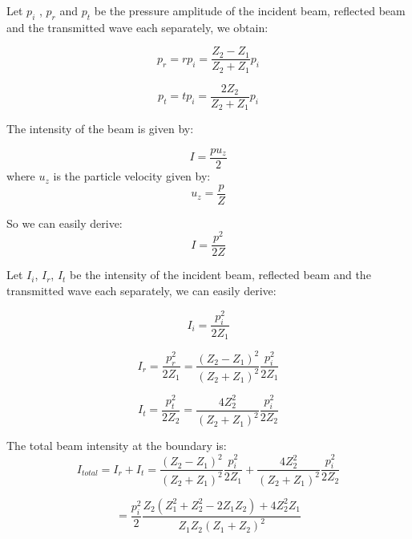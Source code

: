 \documentclass[11pt,a4paper,BCOR12mm, headexclude, footexclude, twoside, openright]{scrartcl}
\numberwithin{equation}{section} %
\numberwithin{figure}{section} %
\numberwithin{table}{section} %
\begin{document}
Let $p_i$ , $p_r$ and $p_t$ be the pressure amplitude of the incident beam, reflected beam and the transmitted wave each separately, we obtain:

\begin{equation}
     p_r = rp_i=\frac{Z_2 - Z_1}{Z_2 + Z_1}p_i
\end{equation}

\begin{equation}
     p_t = tp_i=\frac{2Z_2}{Z_2 + Z_1}p_i
\end{equation}

The intensity of the beam is given by:

\begin{equation}
     I =\frac{pu_z}{2}
\end{equation}
where $u_z$ is the particle velocity given by:
\begin{equation}
     u_z =\frac{p}{Z}
\end{equation}

So we can easily derive:
\begin{equation}
     I =\frac{p^2}{2Z}
\end{equation}

Let $I_i$, $I_r$, $I_t$ be the intensity of the incident beam, reflected beam and the transmitted wave each separately, we can easily derive:

\begin{equation}
     I_i =\frac{p_i^2}{2Z_1}
\end{equation}

\begin{equation}
     I_r =\frac{p_r^2}{2Z_1}=\frac{(Z_2 - Z_1)^2}{(Z_2 + Z_1)^2}\frac{p_i^2}{2Z_1}
\end{equation}

\begin{equation}
     I_t =\frac{p_t^2}{2Z_2}=\frac{4Z_2^2}{(Z_2 + Z_1)^2}\frac{p_i^2}{2Z_2}
\end{equation}

The total beam intensity at the boundary is:
\begin{equation}
     I_{total} = I_r + I_t =\frac{(Z_2 - Z_1)^2}{(Z_2 + Z_1)^2}\frac{p_i^2}{2Z_1}+\frac{4Z_2^2}{(Z_2 + Z_1)^2}\frac{p_i^2}{2Z_2}
\end{equation}

\begin{equation}
      =\frac{p_i^2}{2}\frac{Z_2(Z_1^2+Z_2^2-2Z_1Z_2)+4Z_2^2Z_1}{Z_1Z_2(Z_1+Z_2)^2}
\end{equation}
\end{document}
